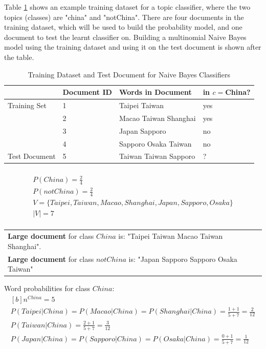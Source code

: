 \documentclass{article}
\begin{document}
Table \ref{tab:example-naive-bayes} shows an example training dataset for a topic classifier, where the two topics (classes) are "china" and "notChina". There are four documents in the training dataset, which will be used to build the probability model, and one document to test the learnt classifier on. Building a multinomial Naive Bayes model using the training dataset and using it on the test document is shown after the table.

\begin{table}[H]
	\centering
	\begin{tabular}{|l|l|l|l|}
	\hline
	& \textbf{Document ID} & \textbf{Words in Document} & \textbf{in $c=$China?} \\
	\hline
	Training Set & 1 & Taipei Taiwan & yes \\
	& 2 & Macao Taiwan Shanghai & yes \\
	& 3 & Japan Sapporo & no \\
	& 4 & Sapporo Osaka Taiwan & no \\
	\hline
	Test Document & 5 & Taiwan Taiwan Sapporo & ? \\
	\hline 
	\end{tabular}
	\caption{Training Dataset and Test Document for Naive Bayes Classifiers}
	\label{tab:example-naive-bayes}
\end{table}

\begin{multline}\\
	P(China) = \frac{2}{4} \\
	P(notChina) = \frac{2}{4} \\
	V = \lbrace Taipei, Taiwan, Macao, Shanghai, Japan, Sapporo, Osaka \rbrace \\
	|V| = 7 \\
\label{eq:example-class-prob}
\end{multline}

\begin{tabular}{l}
\textbf{Large document} for class $China$ is: "Taipei Taiwan Macao Taiwan Shanghai". \\
\textbf{Large document} for class $notChina$ is: "Japan Sapporo Sapporo Osaka Taiwan" \\
\end{tabular}

\hspace{2pt}

Word probabilities for class $China$:
\begin{equation}
\begin{aligned}[b]
n^{China} = 5 \\
P(Taipei|China) = P(Macao|China) = P(Shanghai|China) = \frac{1 + 1}{5 + 7} = \frac{2}{12} \\
P(Taiwan|China) = \frac{2 + 1}{5 + 7} = \frac{3}{12} \\
P(Japan|China) = P(Sapporo|China) = P(Osaka|China) = \frac{0 + 1}{5 + 7} = \frac{1}{12}
\end{aligned}
\end{equation}
\end{document}

